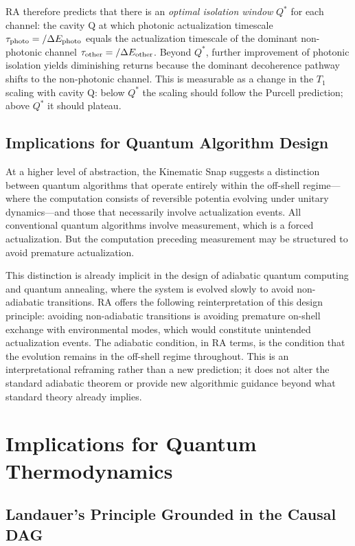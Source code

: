 \documentclass[11pt,a4paper]{article}
\theoremstyle{plain}
\theoremstyle{definition}
\theoremstyle{remark}
\begin{document}
RA therefore predicts that there is an \emph{optimal isolation window} $Q^*$ for
each channel: the cavity Q at which photonic actualization timescale $\tau_{\rm
photo} = \hbar / \Delta E_{\rm photo}$ equals the actualization timescale of the
dominant non-photonic channel $\tau_{\rm other} = \hbar / \Delta E_{\rm other}$.
Beyond $Q^*$, further improvement of photonic isolation yields diminishing returns
because the dominant decoherence pathway shifts to the non-photonic channel. This
is measurable as a change in the $T_1$ scaling with cavity Q: below $Q^*$ the
scaling should follow the Purcell prediction; above $Q^*$ it should plateau.

\subsection{Implications for Quantum Algorithm Design}

At a higher level of abstraction, the Kinematic Snap suggests a distinction
between quantum algorithms that operate entirely within the off-shell regime---
where the computation consists of reversible potentia evolving under unitary
dynamics---and those that necessarily involve actualization events. All
conventional quantum algorithms involve measurement, which is a forced
actualization. But the computation preceding measurement may be structured to
avoid premature actualization.

This distinction is already implicit in the design of adiabatic quantum computing
and quantum annealing, where the system is evolved slowly to avoid non-adiabatic
transitions. RA offers the following reinterpretation of this design principle:
avoiding non-adiabatic transitions is avoiding premature on-shell exchange with
environmental modes, which would constitute unintended actualization events.
The adiabatic condition, in RA terms, is the condition that the evolution remains
in the off-shell regime throughout. This is an interpretational reframing rather
than a new prediction; it does not alter the standard adiabatic theorem or provide
new algorithmic guidance beyond what standard theory already implies.

\section{Implications for Quantum Thermodynamics}
\label{sec:thermodynamics}

\subsection{Landauer's Principle Grounded in the Causal DAG}
\label{sec:landauer}
\end{document}
